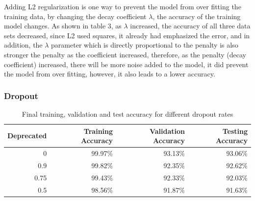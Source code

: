 \documentclass[10pt,letterpaper]{article}
\begin{document}
Adding L2 regularization is one way to prevent the model from over fitting the training data, by changing the decay coefficient $\lambda$, the accuracy of the training model changes. As shown in table 3, as $\lambda$ increased, the accuracy of all three data sets decreased, since L2 used squares, it already had emphasized the error, and in addition, the $\lambda$ parameter which is directly proportional to the penalty is also stronger the penalty as the coefficient increased, therefore, as the penalty (decay coefficient) increased, there will be more noise added to the model, it did prevent the model from over fitting, however, it also leads to a lower accuracy. 


\subsubsection{Dropout}
\begin{table}[H]
\centering
{\small
\begin{tabular}{rrrr}
\hline
      Deprecated &   Training Accuracy &   Validation Accuracy &   Testing Accuracy  \\
\hline
0     &     99.97\%  &      93.13\%  &      93.06\%  \\
0.9 &     99.82\% &      92.35\% &      92.62\% \\
0.75 &     99.43\% &      92.33\% &      92.03\% \\
0.5 &     98.56\% &      91.87\% &      91.63\% \\
\hline
\end{tabular}
}
\vspace{-0.2cm}
\caption{Final training, validation and test accuracy for different dropout rates}
\label{tab:Dropou}
\vspace{-0.4cm}
\end{table}
\end{document}
